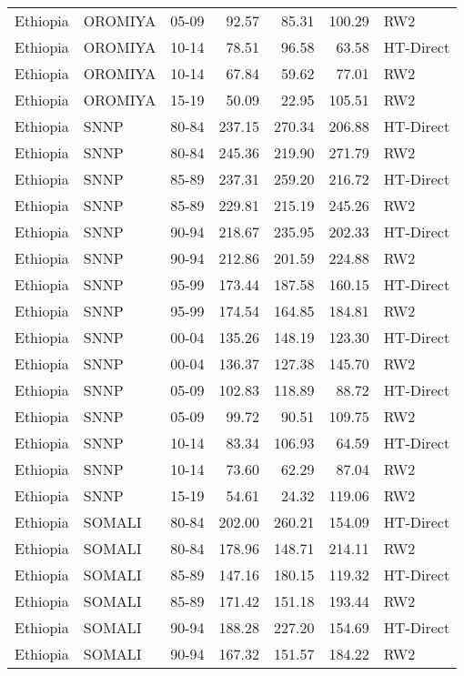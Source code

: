 \begin{longtable}{lllrrrl}
  Ethiopia & OROMIYA & 05-09 & 92.57 & 85.31 & 100.29 & RW2 \\ 
  Ethiopia & OROMIYA & 10-14 & 78.51 & 96.58 & 63.58 & HT-Direct \\ 
  Ethiopia & OROMIYA & 10-14 & 67.84 & 59.62 & 77.01 & RW2 \\ 
  Ethiopia & OROMIYA & 15-19 & 50.09 & 22.95 & 105.51 & RW2 \\ 
  Ethiopia & SNNP & 80-84 & 237.15 & 270.34 & 206.88 & HT-Direct \\ 
  Ethiopia & SNNP & 80-84 & 245.36 & 219.90 & 271.79 & RW2 \\ 
  Ethiopia & SNNP & 85-89 & 237.31 & 259.20 & 216.72 & HT-Direct \\ 
  Ethiopia & SNNP & 85-89 & 229.81 & 215.19 & 245.26 & RW2 \\ 
  Ethiopia & SNNP & 90-94 & 218.67 & 235.95 & 202.33 & HT-Direct \\ 
  Ethiopia & SNNP & 90-94 & 212.86 & 201.59 & 224.88 & RW2 \\ 
  Ethiopia & SNNP & 95-99 & 173.44 & 187.58 & 160.15 & HT-Direct \\ 
  Ethiopia & SNNP & 95-99 & 174.54 & 164.85 & 184.81 & RW2 \\ 
  Ethiopia & SNNP & 00-04 & 135.26 & 148.19 & 123.30 & HT-Direct \\ 
  Ethiopia & SNNP & 00-04 & 136.37 & 127.38 & 145.70 & RW2 \\ 
  Ethiopia & SNNP & 05-09 & 102.83 & 118.89 & 88.72 & HT-Direct \\ 
  Ethiopia & SNNP & 05-09 & 99.72 & 90.51 & 109.75 & RW2 \\ 
  Ethiopia & SNNP & 10-14 & 83.34 & 106.93 & 64.59 & HT-Direct \\ 
  Ethiopia & SNNP & 10-14 & 73.60 & 62.29 & 87.04 & RW2 \\ 
  Ethiopia & SNNP & 15-19 & 54.61 & 24.32 & 119.06 & RW2 \\ 
  Ethiopia & SOMALI & 80-84 & 202.00 & 260.21 & 154.09 & HT-Direct \\ 
  Ethiopia & SOMALI & 80-84 & 178.96 & 148.71 & 214.11 & RW2 \\ 
  Ethiopia & SOMALI & 85-89 & 147.16 & 180.15 & 119.32 & HT-Direct \\ 
  Ethiopia & SOMALI & 85-89 & 171.42 & 151.18 & 193.44 & RW2 \\ 
  Ethiopia & SOMALI & 90-94 & 188.28 & 227.20 & 154.69 & HT-Direct \\ 
  Ethiopia & SOMALI & 90-94 & 167.32 & 151.57 & 184.22 & RW2 \\ 

\end{longtable}
